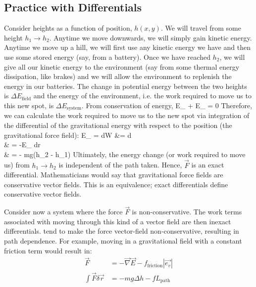 \documentclass[12pt]{article}
\begin{document}
\subsection{Practice with Differentials}
Consider heights as a function of position, $h(x,y)$.  We will travel from some height $h_1 \rightarrow h_2$.  Anytime we move downwards, we will simply gain kinetic energy.  Anytime we move up a hill, we will first use any kinetic energy we have and then use some stored energy (say, from a battery).  Once we have reached $h_2$, we will give all our kinetic energy to the environment (say from some thermal energy dissipation, like brakes) and we will allow the environment to replenish the energy in our batteries.  The change in potential energy between the two heights is $\Delta E_\text{field}$ and the energy of the environment, i.e. the work required to move us to this new spot, is $\Delta E_\text{system}$.  From conservation of energy,
\eqs
\Delta E_ + \Delta E_ = 0
\eqe
Therefore, we can calculate the work required to move us to the new spot via integration of the differential of the gravitational energy with respect to the position (the gravitational force field):
\eqs
\Delta E_ = dW &= \int {} \cdot d\\
& = -\int \nabla E_ \cdot dr\\
& = - mg(h_2 - h_1)
\eqe
Ultimately, the energy change (or work required to move us) from $h_1 \rightarrow h_2$ is independent of the path taken.  Hence, $\vec{F}$ is an exact differential. Mathematicians would say that gravitational force fields are conservative vector fields. This is an equivalence; exact differentials define conservative vector fields.

  Consider now a system where the force $\vec{F}$ is non-conservative.  The work terms associated with moving through this kind of a vector field are then inexact differentials.  tend to make the force vector-field non-conservative, resulting in path dependence. For example, moving in a gravitational field with a constant friction term would result in:
\begin{align*}
\vec{F} &= -\vec{\nabla}\vec{E} - f_\text{friction} | \vec{e_v}|\\
\int \vec{F}\delta\vec{r} &= -mg\Delta h- f L_\text{path}
\end{align*} 
\end{document}
